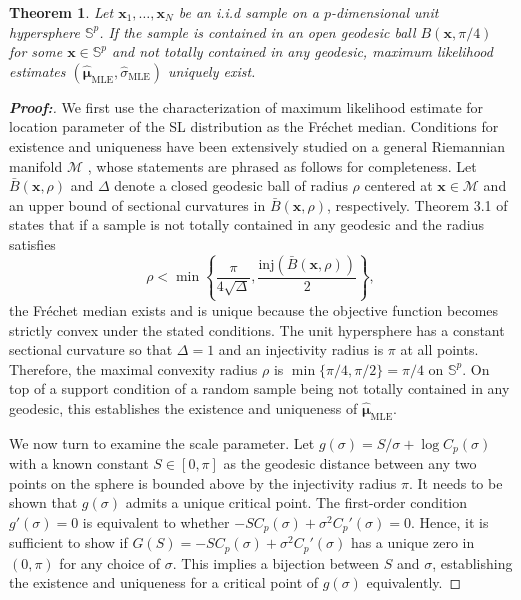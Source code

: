 \documentclass[10pt]{article}
\newtheorem{theorem}{Theorem}[section]
\newcommand{\bfx}{\mathbf{x}}
\newcommand{\bfmu}{\boldsymbol{\mu}}
\newcommand{\bbS}{\mathbb{S}}
\newcommand{\calM}{\mathcal{M}}
\newcommand{\mleloc}{\hat{\bfmu}_{\textrm{MLE}}}
\newcommand{\mlescale}{\hat{\sigma}_{\textrm{MLE}}}
\newcommand{\Frechet}{Fr\'{e}chet }
\begin{document}
\begin{theorem}\label{theory_theorem}
	Let $\bfx_1, \ldots, \bfx_N$ be an i.i.d sample on a $p$-dimensional unit hypersphere $\bbS^p$. If the sample is contained in an open geodesic ball $B(\bfx, \pi/4)$ for some $\bfx \in \bbS^p$ and not totally contained in any geodesic, maximum likelihood estimates $(\mleloc, \mlescale)$ uniquely exist. 
\end{theorem}
\begin{proof}[\textbf{\upshape Proof:}] We first use the characterization of maximum likelihood estimate for location parameter of the SL distribution as the \Frechet median. Conditions for existence and uniqueness have been extensively studied on a general Riemannian manifold $\calM$ \cite{yang_2010_RiemannianMedianIts, arnaudon_2013_MediansMeansRiemannian}, whose statements are phrased as follows for completeness. Let $\bar{B}(\bfx, \rho)$ and $\Delta$ denote a closed geodesic ball of radius $\rho$ centered at $\bfx \in \calM$ and an upper bound of sectional curvatures in $\bar{B}(\bfx, \rho)$, respectively. Theorem 3.1 of \cite{yang_2010_RiemannianMedianIts} states that if a sample is not totally contained in any geodesic and the radius satisfies
	\begin{equation*}
	\rho < \min \left\lbrace \frac{\pi}{4\sqrt{\Delta}}, \frac{\textrm{inj} (\bar{B}(\bfx, \rho))}{2} \right\rbrace,
	\end{equation*}
	the \Frechet median exists and is unique because the objective function becomes strictly convex under the stated conditions. The unit hypersphere has a constant sectional curvature so that $\Delta = 1$ and an injectivity radius is $\pi$ at all points. Therefore, the maximal convexity radius $\rho$ is $\min \lbrace  \pi/4, \pi/2 \rbrace = \pi/4$ on $\bbS^p$. On top of a support condition of a random sample being not totally contained in any geodesic, this establishes the existence and uniqueness of $\mleloc$. 
	
	We now turn to examine the scale parameter. Let $g(\sigma) = S/\sigma + \log C_p (\sigma)$ with a known constant $S \in [0, \pi]$ as the geodesic distance between any two points on the sphere is bounded above by the injectivity radius $\pi$. It needs to be shown that $g(\sigma)$ admits a unique critical point.	The first-order condition $g'(\sigma) = 0$ is equivalent to whether $-S C_p(\sigma) + \sigma^2 C_p'(\sigma)=0$. Hence, it is sufficient to show if $G(S) = -S C_p(\sigma) + \sigma^2 C_p'(\sigma)$ has a unique zero in $(0,\pi)$ for any choice of $\sigma$. This implies a bijection between $S$ and $\sigma$, establishing the existence and uniqueness for a critical point of $g(\sigma)$ equivalently. 
	

\end{proof}
\end{document}
